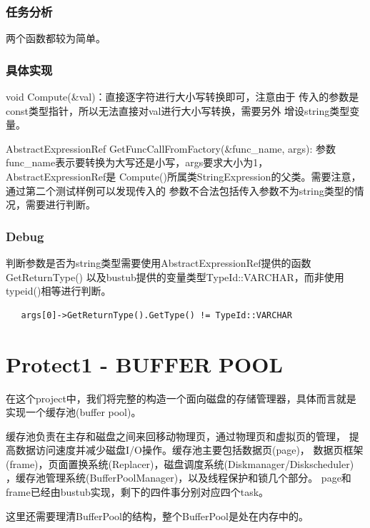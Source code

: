 \documentclass[a4paper]{article}
\begin{document}
\subsubsection{任务分析}

两个函数都较为简单。

\subsubsection{具体实现}

void Compute(\&val)：直接逐字符进行大小写转换即可，注意由于
传入的参数是const类型指针，所以无法直接对val进行大小写转换，需要另外
增设string类型变量。


AbstractExpressionRef GetFuncCallFromFactory(\&func\_name, args):
    参数func\_name表示要转换为大写还是小写，args要求大小为1，AbstractExpressionRef是
    Compute()所属类StringExpression的父类。需要注意，通过第二个测试样例可以发现传入的
    参数不合法包括传入参数不为string类型的情况，需要进行判断。



\subsubsection{Debug}

判断参数是否为string类型需要使用AbstractExpressionRef提供的函数GetReturnType()
以及bustub提供的变量类型TypeId::VARCHAR，而非使用typeid()相等进行判断。

\begin{verbatim}
   args[0]->GetReturnType().GetType() != TypeId::VARCHAR
\end{verbatim}

\section{Protect1 - BUFFER POOL}

在这个project中，我们将完整的构造一个面向磁盘的存储管理器，具体而言就是
实现一个缓存池(buffer pool)。

缓存池负责在主存和磁盘之间来回移动物理页，通过物理页和虚拟页的管理，
提高数据访问速度并减少磁盘I/O操作。缓存池主要包括数据页(page)，
数据页框架(frame)，页面置换系统(Replacer)，磁盘调度系统(Diskmanager/Diskscheduler)
，缓存池管理系统(BufferPoolManager)，以及线程保护和锁几个部分。
page和frame已经由bustub实现，剩下的四件事分别对应四个task。

这里还需要理清BufferPool的结构，整个BufferPool是处在内存中的。
\end{document}

